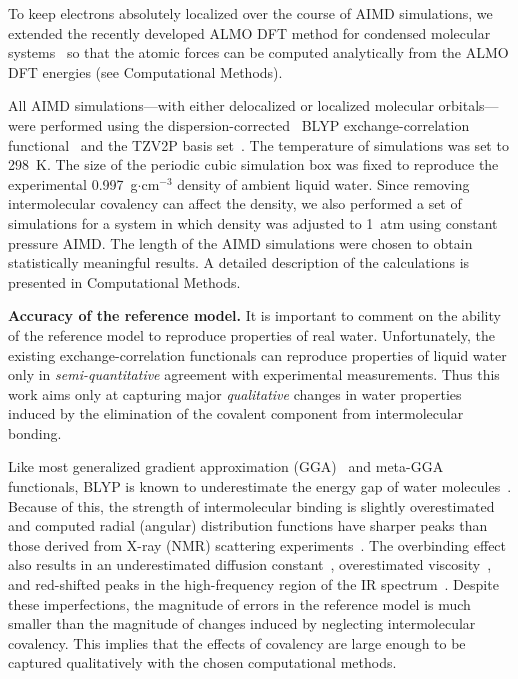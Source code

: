 \documentclass[10pt,amsmath,twocolumn,aps,prl,superscriptaddress,floatfix]{revtex4-1}
\begin{document}
To keep electrons absolutely localized over the course of AIMD simulations, we extended the recently developed ALMO DFT method for condensed molecular systems~\cite{Khaliullin2013JCTC} so that the atomic forces can be computed analytically from the ALMO DFT energies (see Computational Methods).

All AIMD simulations---with either delocalized or localized molecular orbitals---were performed using the dispersion-corrected~\cite{grimme2010consistent} BLYP exchange-correlation functional~\cite{becke1988density, lee1988development} and the TZV2P basis set~\cite{vandevondele2007gaussian}. 
The temperature of simulations was set to 298~K. 
The size of the periodic cubic simulation box was fixed to reproduce the experimental 0.997~g$\cdot$cm$^{-3}$ density of ambient liquid water. 
Since removing intermolecular covalency can affect the density, we also performed a set of simulations for a system in which density was adjusted to 1~atm using constant pressure AIMD. 
The length of the AIMD simulations were chosen to obtain statistically meaningful results. 
A detailed description of the calculations is presented in Computational Methods.

\textbf{Accuracy of the reference model.} It is important to comment on the ability of the reference model to reproduce properties of real water. 
Unfortunately, the existing exchange-correlation functionals can reproduce properties of liquid water only in \emph{semi-quantitative} agreement with experimental measurements. 
Thus this work aims only at capturing major \emph{qualitative} changes in water properties induced by the elimination of the covalent component from intermolecular bonding. 

Like most generalized gradient approximation (GGA)~\cite{cheng2012alignment} and meta-GGA~\cite{chen2017ab} functionals, BLYP is known to underestimate the energy gap of water molecules~\cite{adriaanse2012aqueous}.
Because of this, the strength of intermolecular binding is slightly overestimated and computed radial (angular) distribution functions have sharper peaks than those derived from X-ray (NMR) scattering experiments~\cite{gillan2016perspective, ma2012ab}.
The overbinding effect also results in an underestimated diffusion constant~\cite{bankura2014structure}, overestimated viscosity~\cite{khaliullin2013microscopic}, and red-shifted peaks in the high-frequency region of the IR spectrum~\cite{lee2007dynamical}. 
Despite these imperfections, the magnitude of errors in the reference model is much smaller than the magnitude of changes induced by neglecting intermolecular covalency. 
This implies that the effects of covalency are large enough to be captured qualitatively with the chosen computational methods.
\end{document}
